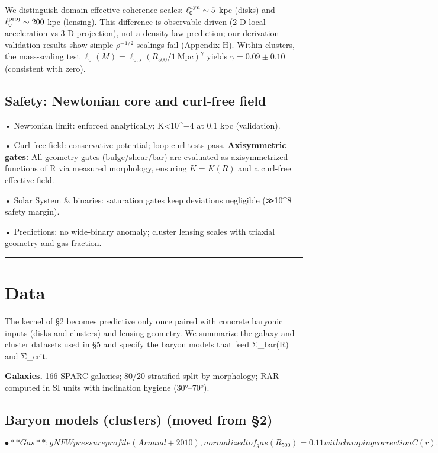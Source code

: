 \documentclass[11pt,a4paper]{article}
\begin{document}
We distinguish domain-effective coherence scales: $\ell_0^{\rm dyn} \sim 5$ kpc (disks) and $\ell_0^{\rm proj} \sim 200$ kpc (lensing). This difference is observable-driven (2-D local acceleration vs 3-D projection), not a density-law prediction; our derivation-validation results show simple $\rho^{-1/2}$ scalings fail (Appendix H). Within clusters, the mass-scaling test $\ell_0(M) = \ell_{0,\star}(R_{500}/1~\mathrm{Mpc})^\gamma$ yields $\gamma = 0.09 \pm 0.10$ (consistent with zero).



\subsection{Safety: Newtonian core and curl‑free field}


• Newtonian limit: enforced analytically; K<10^−4 at 0.1 kpc (validation).  

• Curl‑free field: conservative potential; loop curl tests pass. \textbf{Axisymmetric gates:} All geometry gates (bulge/shear/bar) are evaluated as axisymmetrized functions of R via measured morphology, ensuring $K=K(R)$ and a curl‑free effective field.  

• Solar System \& binaries: saturation gates keep deviations negligible (≫10^8 safety margin).  

• Predictions: no wide‑binary anomaly; cluster lensing scales with triaxial geometry and gas fraction.



\medskip\hrule\medskip


\section{Data}


The kernel of §2 becomes predictive only once paired with concrete baryonic inputs (disks and clusters) and lensing geometry. We summarize the galaxy and cluster datasets used in §5 and specify the baryon models that feed Σ\_bar(R) and Σ\_crit.


\textbf{Galaxies.} 166 SPARC galaxies; 80/20 stratified split by morphology; RAR computed in SI units with inclination hygiene (30°–70°).


\subsection{Baryon models (clusters) (moved from §2)}


\[
• **Gas**: gNFW pressure profile (Arnaud+2010), normalized to f_gas(R_500)=0.11 with clumping correction C(r).
\]
\end{document}
